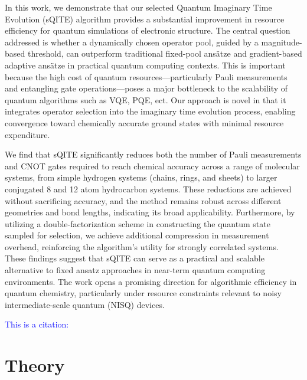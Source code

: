 \documentclass[aip,jcp,amsmath,amssymb, reprint]{revtex4-1}
\newcommand{\note}[2]{%
  \ifthenelse{\boolean{shownotes}}%
    {\textcolor{#1}{#2}}%
    {}%
}
\begin{document}
In this work, we demonstrate that our selected Quantum Imaginary Time Evolution (sQITE) algorithm provides a substantial improvement in resource efficiency for quantum simulations of electronic structure. The central question addressed is whether a dynamically chosen operator pool, guided by a magnitude-based threshold, can outperform traditional fixed-pool ansätze and gradient-based adaptive ansätze in practical quantum computing contexts. This is important because the high cost of quantum resources—particularly Pauli measurements and entangling gate operations—poses a major bottleneck to the scalability of quantum algorithms such as VQE, PQE, ect. Our approach is novel in that it integrates operator selection into the imaginary time evolution process, enabling convergence toward chemically accurate ground states with minimal resource expenditure.

We find that sQITE significantly reduces both the number of Pauli measurements and CNOT gates required to reach chemical accuracy across a range of molecular systems, from simple hydrogen systems (chains, rings, and sheets) to larger conjugated 8 and 12 atom hydrocarbon systems. These reductions are achieved without sacrificing accuracy, and the method remains robust across different geometries and bond lengths, indicating its broad applicability. Furthermore, by utilizing a double-factorization scheme in constructing the quantum state sampled for selection, we achieve additional compression in measurement overhead, reinforcing the algorithm’s utility for strongly correlated systems. These findings suggest that sQITE can serve as a practical and scalable alternative to fixed ansatz approaches in near-term quantum computing environments. The work opens a promising direction for algorithmic efficiency in quantum chemistry, particularly under resource constraints relevant to noisy intermediate-scale quantum (NISQ) devices.







\note{blue}{This is a citation: \cite{Schriber2016Adaptive}}

\section{\label{sec:theory}Theory}
\end{document}
